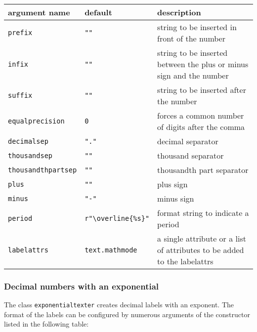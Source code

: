 \medskip
\begin{tabularx}{\linewidth}{ll>{\raggedright\arraybackslash}X}
argument name&default&description\\
\hline
\texttt{prefix}&\texttt{""}&string to be inserted in front of the number\\
\texttt{infix}&\texttt{""}&string to be inserted between the plus or minus sign and the number\\
\texttt{suffix}&\texttt{""}&string to be inserted after the number\\
\texttt{equalprecision}&\texttt{0}&forces a common number of digits after the comma\\
\texttt{decimalsep}&\texttt{"."}&decimal separator\\
\texttt{thousandsep}&\texttt{""}&thousand separator\\
\texttt{thousandthpartsep}&\texttt{""}&thousandth part separator\\
\texttt{plus}&\texttt{""}&plus sign\\
\texttt{minus}&\texttt{"-"}&minus sign\\
\texttt{period}&\texttt{r"\textbackslash overline\{\%s\}"}&format string to indicate a period\\
\texttt{labelattrs}&\texttt{text.mathmode}&a single attribute or a list of attributes to be added to the labelattrs\\
\end{tabularx}
\medskip

\subsubsection{Decimal numbers with an exponential}

The class \verb|exponentialtexter| creates decimal labels with an
exponent. The format of the labels can be configured by numerous
arguments of the constructor listed in the following table:

